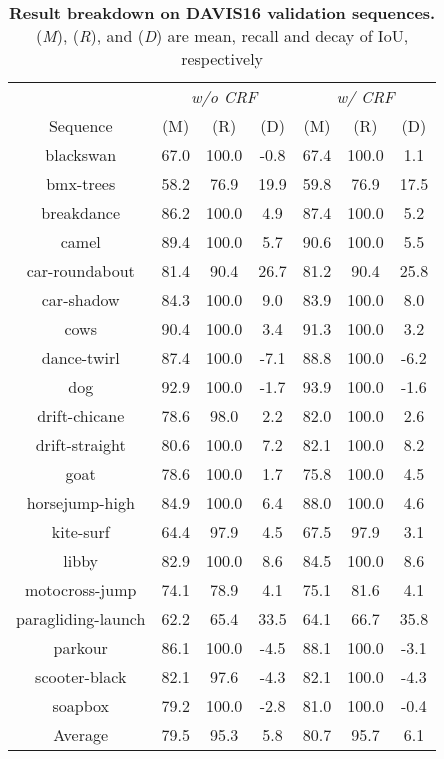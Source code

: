 \begin{table}[t]
    \begin{center}
    \begin{tabular}{cccc@{\hspace{10pt}}ccc}
        \toprule
         & \multicolumn{3}{c}{\textit{w/o CRF}} & \multicolumn{3}{c}{\textit{w/ CRF}} \\
         Sequence & (M) & (R) & (D) & (M) & (R) & (D)  \\
         \midrule
    blackswan      &  67.0 &  100.0 &  -0.8 & 67.4 &  100.0 &    1.1 \\
    bmx-trees      &  58.2 &   76.9 &  19.9 & 59.8 &   76.9 &   17.5 \\
    breakdance     &  86.2 &  100.0 &   4.9 & 87.4 &  100.0 &    5.2 \\
      camel        &  89.4 &  100.0 &   5.7 & 90.6 &  100.0 &    5.5 \\
  car-roundabout   &  81.4 &   90.4 &  26.7 & 81.2 &   90.4 &   25.8 \\
    car-shadow     &  84.3 &  100.0 &   9.0 & 83.9 &  100.0 &    8.0 \\
       cows        &  90.4 &  100.0 &   3.4 & 91.3 &  100.0 &    3.2 \\
   dance-twirl     &  87.4 &  100.0 &  -7.1 & 88.8 &  100.0 &   -6.2 \\
       dog         &  92.9 &  100.0 &  -1.7 & 93.9 &  100.0 &   -1.6 \\
  drift-chicane    &  78.6 &   98.0 &   2.2 & 82.0 &  100.0 &    2.6 \\
  drift-straight   &  80.6 &  100.0 &   7.2 & 82.1 &  100.0 &    8.2 \\
       goat        &  78.6 &  100.0 &   1.7 & 75.8 &  100.0 &    4.5 \\
  horsejump-high   &  84.9 &  100.0 &   6.4 & 88.0 &  100.0 &    4.6 \\
    kite-surf      &  64.4 &   97.9 &   4.5 & 67.5 &   97.9 &    3.1 \\
      libby        &  82.9 &  100.0 &   8.6 & 84.5 &  100.0 &    8.6 \\
  motocross-jump   &  74.1 &   78.9 &   4.1 & 75.1 &   81.6 &    4.1 \\
paragliding-launch &  62.2 &   65.4 &  33.5 & 64.1 &   66.7 &   35.8 \\
     parkour       &  86.1 &  100.0 &  -4.5 & 88.1 &  100.0 &   -3.1 \\
  scooter-black    &  82.1 &   97.6 &  -4.3 & 82.1 &  100.0 &   -4.3 \\
     soapbox       &  79.2 &  100.0 &  -2.8 & 81.0 &  100.0 &   -0.4 \\
\midrule
     Average       &  79.5 &   95.3 &   5.8 & 80.7 &   95.7 &    6.1 \\
            \bottomrule
    \end{tabular}
    \end{center}
    \caption{\textbf{Result breakdown on DAVIS16 validation sequences.} (\textit{M}), (\textit{R}), and (\textit{D}) are mean, recall and decay of IoU, respectively}
    \label{tab:supp_seq_davis}
\end{table}

